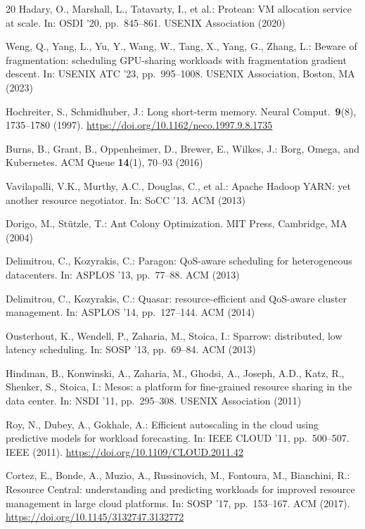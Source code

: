 \documentclass[conference]{IEEEtran}
\begin{document}
\begin{thebibliography}{20}
Hadary, O., Marshall, L., Tatavarty, I., et al.: Protean: VM
allocation service at scale.
In: OSDI '20, pp.\ 845--861. USENIX Association (2020)

Weng, Q., Yang, L., Yu, Y., Wang, W., Tang, X., Yang, G., Zhang, L.:
Beware of fragmentation: scheduling GPU-sharing workloads with
fragmentation gradient descent.
In: USENIX ATC '23, pp.\ 995--1008.
USENIX Association, Boston, MA (2023)

Hochreiter, S., Schmidhuber, J.: Long short-term memory.
Neural Comput.\ \textbf{9}(8), 1735--1780 (1997).
\url{https://doi.org/10.1162/neco.1997.9.8.1735}

Burns, B., Grant, B., Oppenheimer, D., Brewer, E., Wilkes, J.:
Borg, Omega, and Kubernetes.
ACM Queue \textbf{14}(1), 70--93 (2016)

Vavilapalli, V.K., Murthy, A.C., Douglas, C., et al.: Apache Hadoop
YARN: yet another resource negotiator.
In: SoCC '13. ACM (2013)

Dorigo, M., St\"{u}tzle, T.: Ant Colony Optimization.
MIT Press, Cambridge, MA (2004)

Delimitrou, C., Kozyrakis, C.: Paragon: QoS-aware scheduling for
heterogeneous datacenters.
In: ASPLOS '13, pp.\ 77--88. ACM (2013)

Delimitrou, C., Kozyrakis, C.: Quasar: resource-efficient and
QoS-aware cluster management.
In: ASPLOS '14, pp.\ 127--144. ACM (2014)

Ousterhout, K., Wendell, P., Zaharia, M., Stoica, I.: Sparrow:
distributed, low latency scheduling.
In: SOSP '13, pp.\ 69--84. ACM (2013)

Hindman, B., Konwinski, A., Zaharia, M., Ghodsi, A., Joseph, A.D.,
Katz, R., Shenker, S., Stoica, I.: Mesos: a platform for fine-grained
resource sharing in the data center.
In: NSDI '11, pp.\ 295--308. USENIX Association (2011)

Roy, N., Dubey, A., Gokhale, A.: Efficient autoscaling in the cloud
using predictive models for workload forecasting.
In: IEEE CLOUD '11, pp.\ 500--507. IEEE (2011).
\url{https://doi.org/10.1109/CLOUD.2011.42}

Cortez, E., Bonde, A., Muzio, A., Russinovich, M., Fontoura, M.,
Bianchini, R.: Resource Central: understanding and predicting workloads
for improved resource management in large cloud platforms.
In: SOSP '17, pp.\ 153--167. ACM (2017).
\url{https://doi.org/10.1145/3132747.3132772}


\end{thebibliography}
\end{document}
